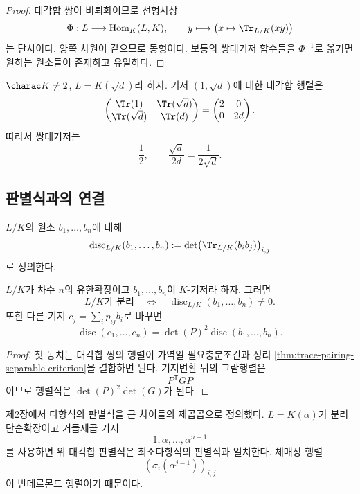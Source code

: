\begin{proof}
대각합 쌍이 비퇴화이므로 선형사상
\[
  \Phi:L\longrightarrow\operatorname{Hom}_K(L,K),
  \qquad
  y\longmapsto\bigl(x\mapsto\Tr_{L/K}(xy)\bigr)
\]
는 단사이다. 양쪽 차원이 같으므로 동형이다. 보통의 쌍대기저 함수들을 $\Phi^{-1}$로 옮기면 원하는 원소들이 존재하고 유일하다.
\end{proof}

\begin{example}
$\charac K\ne2$, $L=K(\sqrt d)$라 하자. 기저 $(1,\sqrt d)$에 대한 대각합 행렬은
\[
  \begin{pmatrix}
    \Tr(1)&\Tr(\sqrt d)\\
    \Tr(\sqrt d)&\Tr(d)
  \end{pmatrix}
  =\begin{pmatrix}
    2&0\\
    0&2d
  \end{pmatrix}.
\]
따라서 쌍대기저는
\[
  \boxed{
  \frac12,
  \qquad
  \frac{\sqrt d}{2d}=\frac1{2\sqrt d}.}
\]
\end{example}

\subsection{판별식과의 연결}

\begin{definition}
$L/K$의 원소 $b_1,\dots,b_n$에 대해
\[
  \operatorname{disc}_{L/K}(b_1,\dots,b_n)
  :=\det\bigl(\Tr_{L/K}(b_i b_j)\bigr)_{i,j}
\]
로 정의한다.
\end{definition}

\begin{proposition}
\label{prop:trace-discriminant-separability}
$L/K$가 차수 $n$의 유한확장이고 $b_1,\dots,b_n$이 $K$-기저라 하자. 그러면
\[
  L/K\text{가 분리}
  \quad\Longleftrightarrow\quad
  \operatorname{disc}_{L/K}(b_1,\dots,b_n)\ne0.
\]
또한 다른 기저 $c_j=\sum_i p_{ij}b_i$로 바꾸면
\[
  \operatorname{disc}(c_1,\dots,c_n)
  =\det(P)^2\operatorname{disc}(b_1,\dots,b_n).
\]
\end{proposition}

\begin{proof}
첫 동치는 대각합 쌍의 행렬이 가역일 필요충분조건과 정리 \ref{thm:trace-pairing-separable-criterion}을 결합하면 된다. 기저변환 뒤의 그람행렬은
\[
  P^{\mathsf T}GP
\]
이므로 행렬식은 $\det(P)^2\det(G)$가 된다.
\end{proof}

\begin{remark}
제2장에서 다항식의 판별식을 근 차이들의 제곱곱으로 정의했다. $L=K(\alpha)$가 분리 단순확장이고 거듭제곱 기저
\[
  1,\alpha,\dots,\alpha^{n-1}
\]
를 사용하면 위 대각합 판별식은 최소다항식의 판별식과 일치한다. 체매장 행렬
\[
  (\sigma_i(\alpha^{j-1}))_{i,j}
\]
이 반데르몬드 행렬이기 때문이다.
\end{remark}


